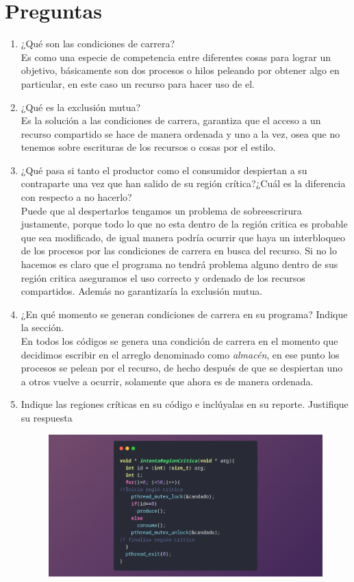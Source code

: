 \documentclass[10pt]{article}
\begin{document}
	\section{Preguntas}
	\begin{enumerate}
		\item ¿Qué son las condiciones de carrera?
		\\Es como una especie de competencia entre diferentes cosas para lograr un objetivo, básicamente son dos procesos o hilos peleando por obtener algo en particular, en este caso un recurso para hacer uso de el. 
		\item  ¿Qué es la exclusión mutua?
		\\ Es la solución a las condiciones de carrera, garantiza que el acceso a un recurso compartido se hace de manera ordenada y uno a la vez, osea que no tenemos sobre escrituras de los recursos o cosas por el estilo.  
		\item ¿Qué pasa si tanto el productor como el consumidor despiertan a su contraparte una vez que han salido de su región crítica?¿Cuál es la diferencia con respecto a no hacerlo?
		\\ Puede que al despertarlos tengamos un problema de sobreescrirura justamente, porque todo lo que no esta dentro de la región critica es probable que sea modificado, de igual manera podría ocurrir que haya un interbloqueo de los procesos por las condiciones de carrera en busca del recurso. Si no lo hacemos es claro que el programa no tendrá problema alguno dentro de sus región critica aseguramos el uso correcto y ordenado de los recursos compartidos. Además no garantizaría la exclusión mutua. 
		\item ¿En qué momento se generan condiciones de carrera en su programa? Indique la sección.
		\\En todos los códigos se genera una condición de carrera en el momento que decidimos escribir en el arreglo denominado como \emph{almacén}, en ese punto los procesos se pelean por el recurso, de hecho después de que se despiertan uno a otros vuelve a ocurrir, solamente que ahora es de manera ordenada.
		\item Indique las regiones críticas en su código e inclúyalas en su reporte. Justifique su respuesta
		\begin{figure}[h!]
			\centering
			\includegraphics[width=0.9\linewidth]{p1}

\end{figure}
\end{enumerate}
\end{document}
